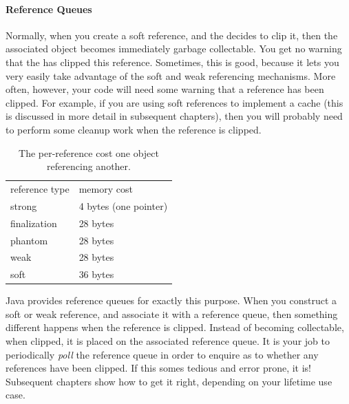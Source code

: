 
\paragraph{Reference Queues}
\label{sec:reference-queues}
Normally, when you create a soft reference, and the \jre decides to clip it,
then the associated  object becomes immediately garbage
collectable. You get no warning that the \jre has clipped this reference.
Sometimes, this is good, because it lets you very easily take advantage of the
soft and weak referencing mechanisms. More often, however, your code will need
some warning that a reference has been clipped. For example, if you are using
soft references to implement a cache (this is discussed in more detail in
subsequent chapters), then you will probably need to perform some cleanup work
when the reference is clipped.


\begin{table}
\centering
	\begin{tabular}{ll}
		\toprule
		reference type & memory cost \\
        \cmidrule(r){1-1} \cmidrule(l){2-2}		
		strong         & 4 bytes (one pointer) \\
		finalization   & 28 bytes \\
        phantom        & 28 bytes \\ 
		weak           & 28 bytes \\
		soft           & 36 bytes \\
		\bottomrule
	\end{tabular}
	\caption{The per-reference cost one object
	referencing another.}
	\label{tab:reference-costs}
\end{table}
Java provides reference queues for exactly this purpose. When you construct a
soft or weak reference, and associate it with a reference queue, then something
different happens when the reference is clipped. Instead of becoming
collectable, when clipped, it is placed on the associated reference queue. It is
your job to periodically \emph{poll} the reference queue in order to enquire as
to whether any references have been clipped. If this somes tedious and error
prone, it is! Subsequent chapters show how to get it right, depending on your
lifetime use case.

